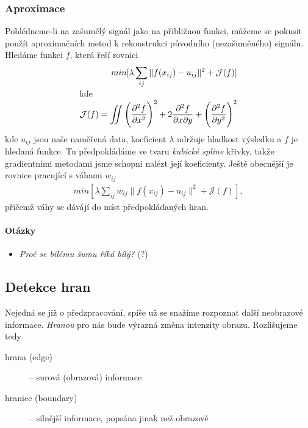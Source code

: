 \subsubsection{Aproximace}
Pohlédneme-li na zašumělý signál jako na přibližnou funkci, můžeme se pokusit použít aproximačních metod k rekonstrukci
původního (nezašuměného) signálu. Hledáme funkci $f$, která řeší rovnici
\begin{align}
min[\lambda \sum\limits_{ij} \|f(x_{ij})-u_{ij}\|^2+\mathcal{J}(f)]\\
\noalign{\hbox{kde}\nonumber}
\mathcal{J}(f)=\int\!\!\!\!\int\left(\frac{\partial^2f}{\partial x^2}\right)^2+2\frac{\partial^2f}{\partial x\partial y}+
\left(\frac{\partial^2f}{\partial y^2}\right)^2
\end{align}
kde $u_{ij}$ jsou naše naměřená data, koeficient $\lambda$ udržuje hladkost výsledku a $f$ je hledaná funkce.
Tu předpokládáme ve tvaru \emph{kubické spline} křivky, takže gradientními metodami jsme schopni nalézt její koeficienty.
Ještě obecnější je rovnice pracující s váhami $w_{ij}$
\begin{align}
min[\lambda \sum\limits_{ij}w_{ij}\|f(x_{ij})-u_{ij}\|^2+\mathcal{J}(f)],
\end{align}
přičemž váhy se dávájí do míst předpokládaných hran.


\paragraph{Otázky}
\begin{itemize}
	\item \emph{Proč se bílému šumu říká bílý?} (?)
\end{itemize}

\subsection{Detekce hran}
Nejedná se již o předzpracování, spíše už se snažíme rozpoznat další neobrazové informace. \emph{Hranou} pro nás bude
výrazná změna intenzity obrazu. Rozlišujeme tedy

\begin{description}
\item[hrana (edge)] -- surová (obrazová) informace
\item[hranice (boundary)] -- silnější informace, popsána jinak než obrazově
\end{description}

